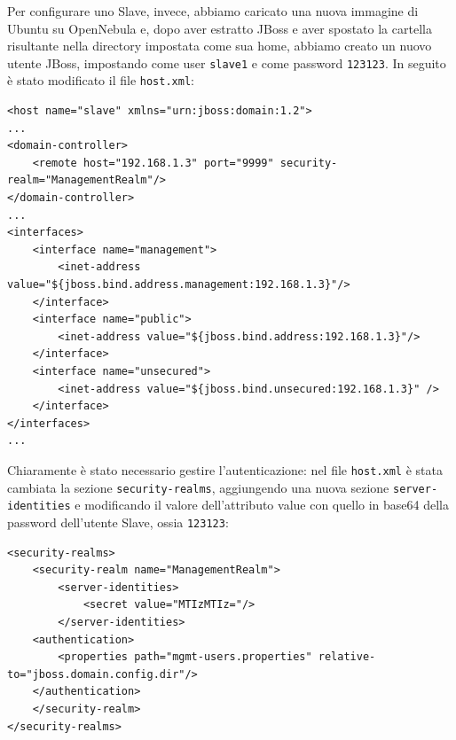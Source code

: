 \documentclass[twoside]{article}
\begin{document}
Per configurare uno Slave, invece, abbiamo caricato una nuova immagine di Ubuntu su OpenNebula
e, dopo aver estratto JBoss e aver spostato la cartella risultante nella directory
impostata come sua home, abbiamo creato un nuovo utente JBoss, impostando come
user \texttt{slave1} e come password \texttt{123123}.
In seguito è stato modificato il file \texttt{host.xml}:
\newpage

\begin{lstlisting}[frame=trBL]
<host name="slave" xmlns="urn:jboss:domain:1.2">
...
<domain-controller>
	<remote host="192.168.1.3" port="9999" security-realm="ManagementRealm"/>
</domain-controller>
...
<interfaces>
	<interface name="management">
		<inet-address value="${jboss.bind.address.management:192.168.1.3}"/>
	</interface>
	<interface name="public">
		<inet-address value="${jboss.bind.address:192.168.1.3}"/>
	</interface>
	<interface name="unsecured">
		<inet-address value="${jboss.bind.unsecured:192.168.1.3}" />
	</interface>
</interfaces>
...
\end{lstlisting}

Chiaramente è stato necessario gestire l'autenticazione: nel file \texttt{host.xml}
è stata cambiata la sezione \texttt{security-realms}, aggiungendo una nuova sezione \texttt{server-identities}
e modificando il valore dell'attributo value con quello in base64 della password dell'utente Slave,
ossia \texttt{123123}:
\begin{lstlisting}[frame=trBL]
<security-realms>
	<security-realm name="ManagementRealm">
		<server-identities>
			<secret value="MTIzMTIz="/>
		</server-identities>
	<authentication>
		<properties path="mgmt-users.properties" relative-to="jboss.domain.config.dir"/>
	</authentication>
	</security-realm>
</security-realms>
\end{lstlisting}
\end{document}
